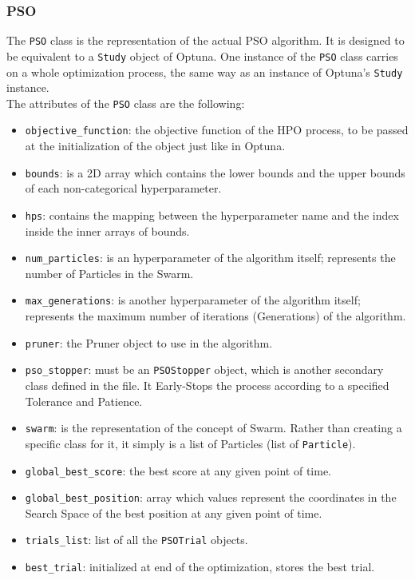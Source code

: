 \subsubsection{PSO}

The \texttt{PSO} class is the representation of the actual PSO algorithm. It is designed to be equivalent to a \texttt{Study} object of Optuna.
One instance of the \texttt{PSO} class carries on a whole optimization process, the same way as an instance of Optuna's \texttt{Study} instance.
% 
\\[0.3cm]The attributes of the \texttt{PSO} class are the following:
\begin{itemize}[itemsep=0.1cm]
    \item \texttt{objective\_function}: the objective function of the HPO process, to be passed at the initialization of the object just like in Optuna.
    \item \texttt{bounds}: is a 2D array which contains the lower bounds and the upper bounds of each non-categorical hyperparameter.
    \item \texttt{hps}: contains the mapping between the hyperparameter name and the index inside the inner arrays of bounds.
    \item \texttt{num\_particles}: is an hyperparameter of the algorithm itself; represents the number of Particles in the Swarm.
    \item \texttt{max\_generations}: is another hyperparameter of the algorithm itself; represents the maximum number of iterations (Generations) of the algorithm.
    \item \texttt{pruner}: the Pruner object to use in the algorithm.
    \item \texttt{pso\_stopper}: must be an \texttt{PSOStopper} object, which is another secondary class defined in the file. It Early-Stops the process according to a specified Tolerance and Patience.
    \item \texttt{swarm}: is the representation of the concept of Swarm. Rather than creating a specific class for it, it simply is a list of Particles (list of \texttt{Particle}).
    \item \texttt{global\_best\_score}: the best score at any given point of time.
    \item \texttt{global\_best\_position}: array which values represent the coordinates in the Search Space of the best position at any given point of time.
    \item \texttt{trials\_list}: list of all the \texttt{PSOTrial} objects.
    \item \texttt{best\_trial}: initialized at end of the optimization, stores the best trial.
\end{itemize}
